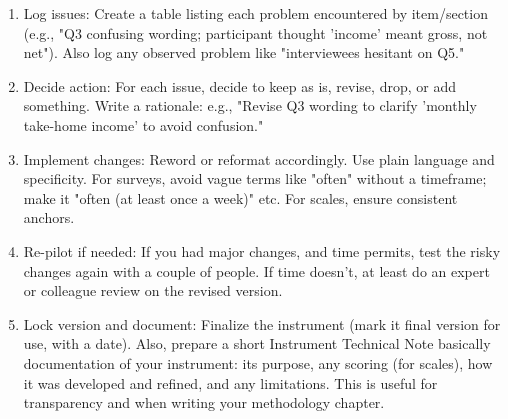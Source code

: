 \documentclass[10pt]{article}
\begin{document}
\begin{enumerate}
  \item Log issues: Create a table listing each problem encountered by item/section (e.g., "Q3 confusing wording; participant thought 'income' meant gross, not net"). Also log any observed problem like "interviewees hesitant on Q5."
  \item Decide action: For each issue, decide to keep as is, revise, drop, or add something. Write a rationale: e.g., "Revise Q3 wording to clarify 'monthly take-home income' to avoid confusion."
  \item Implement changes: Reword or reformat accordingly. Use plain language and specificity. For surveys, avoid vague terms like "often" without a timeframe; make it "often (at least once a week)" etc. For scales, ensure consistent anchors.
  \item Re-pilot if needed: If you had major changes, and time permits, test the risky changes again with a couple of people. If time doesn't, at least do an expert or colleague review on the revised version.
  \item Lock version and document: Finalize the instrument (mark it final version for use, with a date). Also, prepare a short Instrument Technical Note basically documentation of your instrument: its purpose, any scoring (for scales), how it was developed and refined, and any limitations. This is useful for transparency and when writing your methodology chapter.
\end{enumerate}
\end{document}
